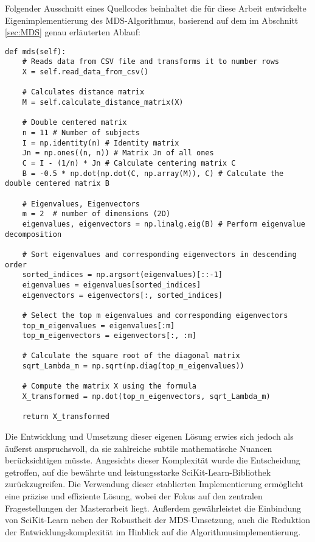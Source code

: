 \noindent
\begin{minipage}{\linewidth}
Folgender Ausschnitt eines Quellcodes beinhaltet die für diese
Arbeit entwickelte Eigenimplementierung des MDS-Algorithmus, basierend auf dem im Abschnitt
\ref{sec:MDS} genau erläuterten Ablauf:
\begin{lstlisting}[style=Python]
def mds(self):
    # Reads data from CSV file and transforms it to number rows
    X = self.read_data_from_csv()

    # Calculates distance matrix
    M = self.calculate_distance_matrix(X)

    # Double centered matrix
    n = 11 # Number of subjects
    I = np.identity(n) # Identity matrix
    Jn = np.ones((n, n)) # Matrix Jn of all ones
    C = I - (1/n) * Jn # Calculate centering matrix C
    B = -0.5 * np.dot(np.dot(C, np.array(M)), C) # Calculate the double centered matrix B

    # Eigenvalues, Eigenvectors
    m = 2  # number of dimensions (2D)
    eigenvalues, eigenvectors = np.linalg.eig(B) # Perform eigenvalue decomposition

    # Sort eigenvalues and corresponding eigenvectors in descending order
    sorted_indices = np.argsort(eigenvalues)[::-1]
    eigenvalues = eigenvalues[sorted_indices]
    eigenvectors = eigenvectors[:, sorted_indices]

    # Select the top m eigenvalues and corresponding eigenvectors
    top_m_eigenvalues = eigenvalues[:m]
    top_m_eigenvectors = eigenvectors[:, :m]

    # Calculate the square root of the diagonal matrix
    sqrt_Lambda_m = np.sqrt(np.diag(top_m_eigenvalues))

    # Compute the matrix X using the formula
    X_transformed = np.dot(top_m_eigenvectors, sqrt_Lambda_m)

    return X_transformed
\end{lstlisting}
\end{minipage}

Die Entwicklung und Umsetzung dieser eigenen Lösung erwies
sich jedoch als äußerst anspruchsvoll, da sie zahlreiche subtile mathematische
Nuancen berücksichtigen müsste. Angesichts dieser Komplexität wurde die
Entscheidung getroffen, auf die bewährte und leistungsstarke
SciKit-Learn-Bibliothek zurückzugreifen. Die Verwendung dieser etablierten
Implementierung ermöglicht eine präzise und effiziente Lösung, wobei der Fokus
auf den zentralen Fragestellungen der Masterarbeit liegt. Außerdem gewährleistet
die Einbindung von SciKit-Learn neben der Robustheit der MDS-Umsetzung, auch die
Reduktion der Entwicklungskomplexität im Hinblick auf die
Algorithmusimplementierung. \parencite{developers_scikit-learn_2023}

